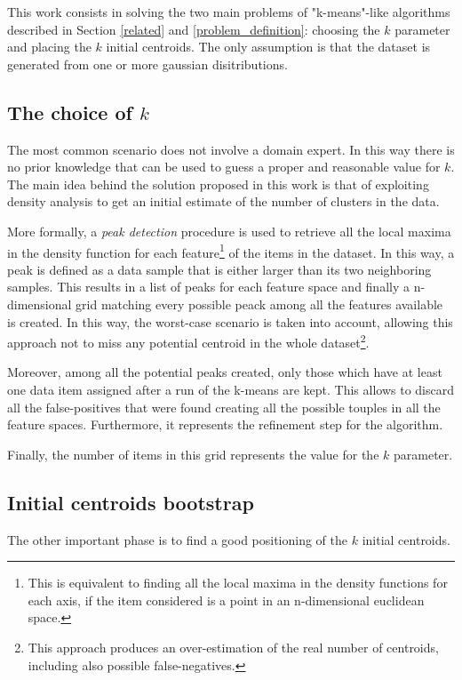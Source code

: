 This work consists in solving the two main problems of "k-means"-like 
algorithms described in Section \ref{related} and \ref{problem_definition}:
choosing the $k$ parameter and placing the $k$ initial centroids.
The only assumption is that the dataset is generated from one or more gaussian
disitributions.


\subsection*{The choice of $k$}
The most common scenario does not involve a domain expert. In this way there is 
no prior knowledge that can be used to guess a proper and reasonable value for $k$.
The main idea behind the solution proposed in this work is that of exploiting density
analysis to get an initial estimate of the number of clusters in the data.

More formally, a \emph{peak detection} procedure is used to retrieve all the local
maxima in the density function for each feature\footnote{This is equivalent to finding 
all the local maxima in the density functions for each axis, if the item considered is
a point in an n-dimensional euclidean space.} of the items in the dataset. In this way,
a peak is defined as a data sample that is either larger than its two neighboring samples.
This results in a list of peaks for each feature space and finally a n-dimensional grid
matching every possible peack among all the features available is created.
In this way, the worst-case scenario is taken into account, allowing this approach not
to miss any potential centroid in the whole dataset\footnote{This approach produces an 
over-estimation of the real number of centroids, including also possible false-negatives.}.

Moreover, among all the potential peaks created, only those which have at least one data
item assigned after a run of the k-means are kept. This allows to discard all the 
false-positives that were found creating all the possible touples in all the feature spaces.
Furthermore, it represents the refinement step for the algorithm.

Finally, the number of items in this grid represents the value for the $k$ parameter.


\subsection*{Initial centroids bootstrap}
The other important phase is to find a good positioning of the $k$ initial centroids.



